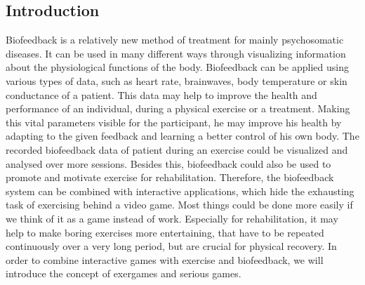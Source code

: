 \begin{multicols}{2}

\section{Introduction}
Biofeedback is a relatively new method of treatment for mainly psychosomatic diseases. It can be used in many different ways through visualizing information about the physiological functions of the body. Biofeedback can be applied using various types of data, such as heart rate, brainwaves, body temperature or skin conductance of a patient. This data may help to improve the health and performance of an individual, during a physical exercise or a treatment. Making this vital parameters visible for the participant, he may improve his health by adapting to the given feedback and learning a better control of his own body.\cite{Goe2010} The recorded biofeedback data of patient during an exercise could be visualized and analysed over more sessions. Besides this, biofeedback could also be used to promote and motivate exercise for rehabilitation. Therefore, the biofeedback system can be combined with interactive applications, which hide the exhausting task of exercising behind a video game. Most things could be done more easily if we think of it as a game instead of work. Especially for rehabilitation, it may help to make boring exercises more entertaining, that have to be repeated continuously over a very long
period, but are crucial for physical recovery. In order to combine interactive games with
exercise and biofeedback, we will introduce the concept of exergames and serious games.

\end{multicols}

